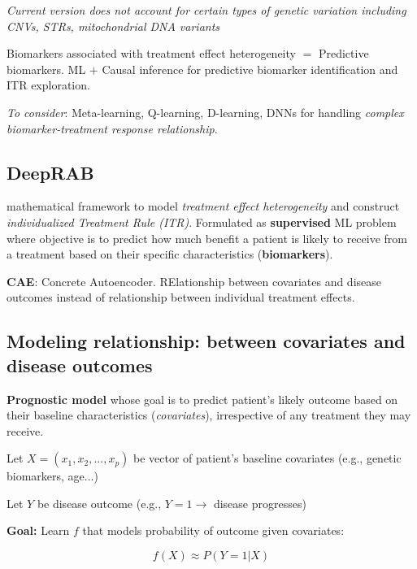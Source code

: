 \documentclass[../main.tex]{subfiles}
\begin{document}
\textit{Current version does not account for certain types of genetic variation including CNVs, STRs, mitochondrial DNA variants}

\hrulefill

 \cite{liu2025deep}

Biomarkers associated with treatment effect heterogeneity $=$ Predictive biomarkers. 
ML $+$ Causal inference for predictive biomarker identification and ITR exploration. 

\textit{To consider}: Meta-learning, Q-learning, D-learning, DNNs for handling \textit{complex biomarker-treatment response relationship}.

\subsection*{DeepRAB} mathematical framework to model \textit{treatment effect heterogeneity} and construct \textit{individualized Treatment Rule (ITR)}. Formulated as \textbf{supervised} ML problem where objective is to predict how much benefit a patient is likely to receive from a treatment based on their specific characteristics (\textbf{biomarkers}).

\textbf{CAE}: Concrete Autoencoder.  RElationship between covariates and disease outcomes instead of relationship between individual treatment effects.

\subsection*{ Modeling relationship: between covariates and disease outcomes}

\textbf{Prognostic model} whose goal is to predict patient's likely outcome based on their baseline characteristics (\textit{covariates}), irrespective of any treatment they may receive.

Let $X = (x_1,x_2,...,x_p)$ be vector of patient's baseline covariates (e.g., genetic biomarkers, age...)

Let $Y$ be disease outcome (e.g., $Y = 1 \rightarrow$ disease progresses) 

\textbf{Goal:} Learn $f$ that models probability of outcome given covariates:

\begin{center}
    \[
    f(X) \approx P(Y=1|X)
    \]
\end{center}
\end{document}
